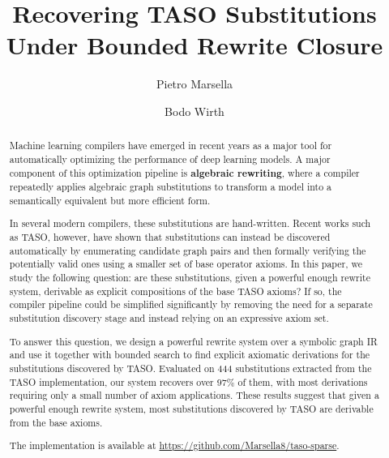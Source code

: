 \documentclass[sigplan,10pt,nonacm]{acmart}
\title{Recovering TASO Substitutions Under Bounded Rewrite Closure}
\author{Pietro Marsella}
\author{Bodo Wirth}
\begin{document}
\begin{abstract}
Machine learning compilers have emerged in recent years as a major tool for automatically optimizing the performance of deep learning models. A major component of this optimization pipeline is \textbf{algebraic rewriting}, where a compiler repeatedly applies algebraic graph substitutions to transform a model into a semantically equivalent but more efficient form.

In several modern compilers, these substitutions are hand-written. Recent works such as TASO, however, have shown that substitutions can instead be discovered automatically by enumerating candidate graph pairs and then formally verifying the potentially valid ones using a smaller set of base operator axioms. In this paper, we study the following question: are these substitutions, given a powerful enough rewrite system, derivable as explicit compositions of the base TASO axioms? If so, the compiler pipeline could be simplified significantly by removing the need for a separate substitution discovery stage and instead relying on an expressive axiom set.

To answer this question, we design a powerful rewrite system over a symbolic graph IR and use it together with bounded search to find explicit axiomatic derivations for the substitutions discovered by TASO. Evaluated on 444 substitutions extracted from the TASO implementation, our system recovers over $97\%$ of them, with most derivations requiring only a small number of axiom applications. These results suggest that given a powerful enough rewrite system, most substitutions discovered by TASO are derivable from the base axioms.

The implementation is available at \url{https://github.com/Marsella8/taso-sparse}.
\end{abstract}
\maketitle

\end{document}
